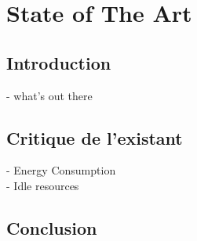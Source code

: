 

\chapter{State of The Art}

\ifpdf
    \graphicspath{{Chapter3/Figs/Raster/}{Chapter3/Figs/PDF/}{Chapter3/Figs/}}
\else
    \graphicspath{{Chapter3/Figs/Vector/}{Chapter3/Figs/}}
\fi


\section{Introduction}
- what's out there

\section{Critique de l'existant}
    - Energy Consumption \\
    - Idle resources \\

\section{Conclusion}